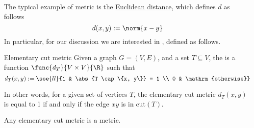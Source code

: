 \documentclass[a4paper, 12pt]{report}
\begin{document}
    The typical example of metric is the \href{https://en.wikipedia.org/wiki/Euclidean_distance}{Euclidean distance}, which defines $d$ as follows $$d(x, y) := \norm{x - y}$$ In particular, for our discussion we are interested in , defined as follows.

    \begin{frameddefn}{Elementary cut metric}
        Given a graph $G = (V, E)$, and a set $T \subseteq V$, the  is a function $\func{d_T}{V \times V}{\R}$ such that $$d_T(x, y) := \soe{ll}{1 & \abs{T \cap \{x, y\}} = 1 \\ 0 & \mathrm{otherwise}}$$
    \end{frameddefn}

    In other words, for a given set of vertices $T$, the elementary cut metric $d_T(x, y)$ is equal to 1 if and only if the edge $xy$ is in $\mathrm{cut}(T)$.

    \begin{framedprop}{}
        Any elementary cut metric is a metric.
    \end{framedprop}
\end{document}
